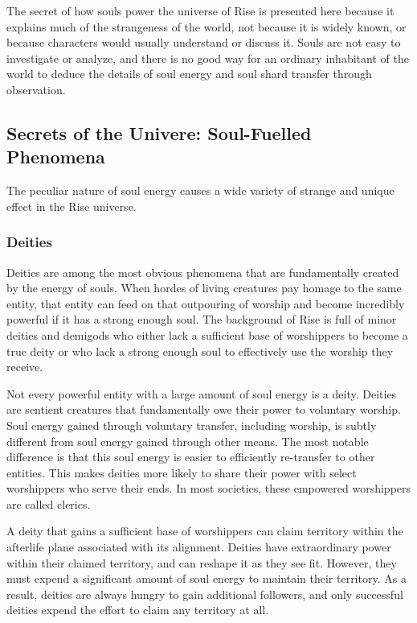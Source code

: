             The secret of how souls power the universe of Rise is presented here because it explains much of the strangeness of the world, not because it is widely known, or because characters would usually understand or discuss it.
            Souls are not easy to investigate or analyze, and there is no good way for an ordinary inhabitant of the world to deduce the details of soul energy and soul shard transfer through observation.

    \subsection{Secrets of the Univere: Soul-Fuelled Phenomena}

        The peculiar nature of soul energy causes a wide variety of strange and unique effect in the Rise universe.

        \subsubsection{Deities}
            Deities are among the most obvious phenomena that are fundamentally created by the energy of souls.
            When hordes of living creatures pay homage to the same entity, that entity can feed on that outpouring of worship and become incredibly powerful if it has a strong enough soul.
            The background of Rise is full of minor deities and demigods who either lack a sufficient base of worshippers to become a true deity or who lack a strong enough soul to effectively use the worship they receive.

            Not every powerful entity with a large amount of soul energy is a deity.
            Deities are sentient creatures that fundamentally owe their power to voluntary worship.
            Soul energy gained through voluntary transfer, including worship, is subtly different from soul energy gained through other means.
            The most notable difference is that this soul energy is easier to efficiently re-transfer to other entities.
            This makes deities more likely to share their power with select worshippers who serve their ends.
            In most societies, these empowered worshippers are called clerics.

            A deity that gains a sufficient base of worshippers can claim territory within the afterlife plane associated with its alignment.
            Deities have extraordinary power within their claimed territory, and can reshape it as they see fit.
            However, they must expend a significant amount of soul energy to maintain their territory.
            As a result, deities are always hungry to gain additional followers, and only successful deities expend the effort to claim any territory at all.

